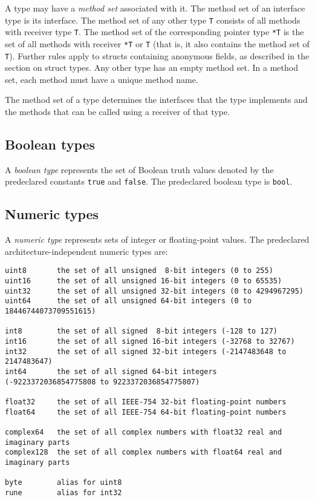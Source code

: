A type may have a \emph{method set} associated with it. The method
set of an interface type is its interface. The method set of any
other type \texttt{T} consists of all methods with receiver type
\texttt{T}. The method set of the corresponding pointer type
\texttt{*T} is the set of all methods with receiver \texttt{*T} or
\texttt{T} (that is, it also contains the method set of \texttt{T}).
Further rules apply to structs containing anonymous fields, as
described in the section on struct types. Any other type has an
empty method set. In a method set, each method must have a unique
method name.

The method set of a type determines the interfaces that the type
implements and the methods that can be
called using a receiver of that type.

\subsection*{Boolean types}

A \emph{boolean type} represents the set of Boolean truth values denoted
by the predeclared constants \texttt{true} and \texttt{false}. The
predeclared boolean type is \texttt{bool}.

\subsection*{Numeric types}

A \emph{numeric type} represents sets of integer or floating-point
values. The predeclared architecture-independent numeric types are:

\begin{Verbatim}[frame=single]
uint8       the set of all unsigned  8-bit integers (0 to 255)
uint16      the set of all unsigned 16-bit integers (0 to 65535)
uint32      the set of all unsigned 32-bit integers (0 to 4294967295)
uint64      the set of all unsigned 64-bit integers (0 to 18446744073709551615)

int8        the set of all signed  8-bit integers (-128 to 127)
int16       the set of all signed 16-bit integers (-32768 to 32767)
int32       the set of all signed 32-bit integers (-2147483648 to 2147483647)
int64       the set of all signed 64-bit integers (-9223372036854775808 to 9223372036854775807)

float32     the set of all IEEE-754 32-bit floating-point numbers
float64     the set of all IEEE-754 64-bit floating-point numbers

complex64   the set of all complex numbers with float32 real and imaginary parts
complex128  the set of all complex numbers with float64 real and imaginary parts

byte        alias for uint8
rune        alias for int32
\end{Verbatim}

